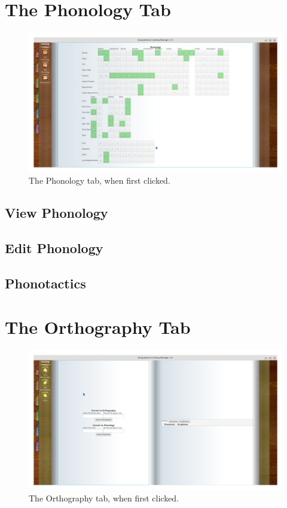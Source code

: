 \documentclass{report}
\begin{document}
	\chapter{The Phonology Tab}
	\begin{figure}[ht]
		\centering
		\includegraphics[width=1\linewidth]{img/phonology-tab}
		\caption{The Phonology tab, when first clicked.}
		\label{fig:phonology-tab}
	\end{figure}
	\section{View Phonology}
	\section{Edit Phonology}
	\section{Phonotactics}
	
	\chapter{The Orthography Tab}
	\begin{figure}[ht]
		\centering
		\includegraphics[width=1\linewidth]{img/orthography-tab}
		\caption{The Orthography tab, when first clicked.}
		\label{fig:orthography-tab}
	\end{figure}
\end{document}
